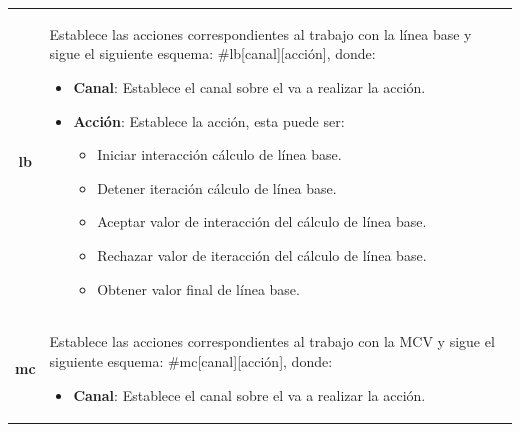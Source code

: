 \begin{table}[h]
\begin{tabular}{ |c|p{14cm}|}
\begin{minipage}{14cm}
                            \end{minipage}\\\hline
        \textbf{lb}     &   \begin{minipage}{14cm}
                                \vspace{1pt}
                                Establece las acciones correspondientes al trabajo con la línea base y sigue el siguiente esquema: \#lb[canal][acción], donde:
                                \begin{itemize}
                                    \item \textbf{Canal}: Establece el canal sobre el va a realizar la acción.
                                    \item \textbf{Acción}: Establece la acción, esta puede ser: 
                                    \begin{itemize}
                                        \item Iniciar interacción cálculo de línea base.
                                        \item Detener iteración cálculo de línea base.
                                        \item Aceptar valor de interacción del cálculo de línea base.
                                        \item Rechazar valor de iteracción del cálculo de línea base.
                                        \item Obtener valor final de línea base.
                                    \end{itemize}
                                \end{itemize} 
                                \vspace{1pt}
                            \end{minipage}\\\hline
        \textbf{mc}     &   \begin{minipage}{14cm}
                                \vspace{1pt}
                                Establece las acciones correspondientes al trabajo con la MCV y sigue el siguiente esquema: \#mc[canal][acción], donde:
                                \begin{itemize}
                                    \item \textbf{Canal}: Establece el canal sobre el va a realizar la acción.

\end{itemize}
\end{minipage}
\end{tabular}
\end{table}
